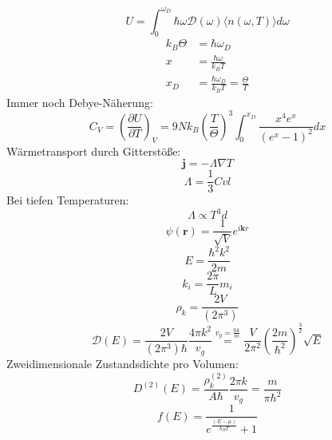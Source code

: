 \documentclass[11pt]{article}
\begin{document}
\begin{equation}
  U=\int_0^{\omega_D}\hbar\omega\mathcal{D}(\omega)\langle n(\omega,T)\rangle
  d\omega
\end{equation}
\begin{equation}
  \begin{align}
    k_B\Theta&=\hbar\omega_D \\
    x&=\frac{\hbar\omega}{k_BT}\\
    x_D&=\frac{\hbar\omega_D}{k_BT}=\frac{\Theta}{T}
  \end{align}
\end{equation}
Immer noch Debye-Näherung:
\begin{equation}
  C_V=\left(\frac{\partial U}{\partial T}\right)_V=
  9Nk_B\left(\frac{T}{\Theta}\right)^3\int_0^{x_D}\frac{x^4e^x}{(e^x-1)^2}dx
\end{equation}
Wärmetransport durch Gitterstöße:
\begin{equation}
  \bm{j}=-\Lambda\nabla T
\end{equation}
\begin{equation}
  \Lambda=\frac{1}{3}Cvl
\end{equation}
Bei tiefen Temperaturen:
\begin{equation}
  \Lambda\propto T^3d
\end{equation}
\begin{equation}
  \psi(\bm{r})=\frac{1}{\sqrt{V}}e^{i\bm{k}{r}}
\end{equation}
\begin{equation}
  E=\frac{\hbar^2k^2}{2m}
\end{equation}
\begin{equation}
  k_i=\frac{2\pi}{L}m_i
\end{equation}
\begin{equation}
  \rho_k=\frac{2V}{(2\pi^3)}
\end{equation}
\begin{equation}
  \mathcal{D}(E)=\frac{2V}{(2\pi^3)\hbar}\frac{4\pi k^2}{v_g}\overset{
  v_g=\frac{\hbar k}{m}}{=}
  \frac{V}{2\pi^2}\left( \frac{2m}{\hbar^2} \right)^{\frac{3}{2}}\sqrt{E}
\end{equation}
Zweidimensionale Zustandsdichte pro Volumen:
\begin{equation}
  D^{(2)}(E)=\frac{\rho_k^{(2)}}{A\hbar}\frac{2\pi k}{v_g}=\frac{m}{\pi\hbar^2}
\end{equation}
\begin{equation}
  f(E)=\frac{1}{e^{\frac{(E-\mu)}{k_BT}}+1}
\end{equation}
\end{document}
